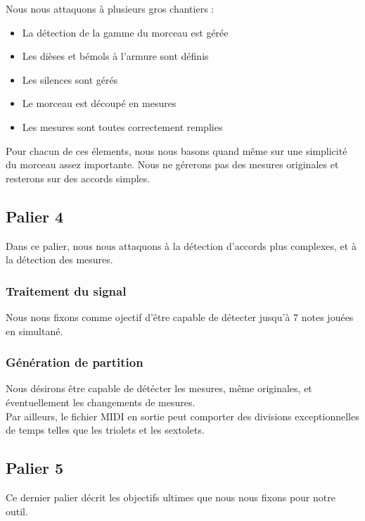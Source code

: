 \documentclass[12pt]{article}
\begin{document}
Nous nous attaquons à plusieurs gros chantiers :

\begin{itemize}
\item La détection de la gamme du morceau est gérée
\item Les dièses et bémols à l’armure sont définis
\item Les silences sont gérés
\item Le morceau est découpé en mesures
\item Les mesures sont toutes correctement remplies\\
\end{itemize}

Pour chacun de ces élements, nous nous basons quand même sur une simplicité du morceau assez importante. Nous ne gérerons pas des mesures originales et resterons sur des accords simples.

\newpage
\subsection{Palier 4}

Dans ce palier, nous nous attaquons à la détection d'accords plus complexes, et à la détection des mesures.\\

\subsubsection{Traitement du signal}

Nous nous fixons comme ojectif d'être capable de détecter jusqu'à 7 notes jouées en simultané.

\subsubsection{Génération de partition}

Nous désirons être capable de détécter les mesures, même originales, et éventuellement les changements de mesures.\\

Par ailleurs, le fichier MIDI en sortie peut comporter des divisions exceptionnelles de temps telles que les triolets et les sextolets.

\newpage
\subsection{Palier 5}

Ce dernier palier décrit les objectifs ultimes que nous nous fixons pour notre outil. \\
\end{document}
